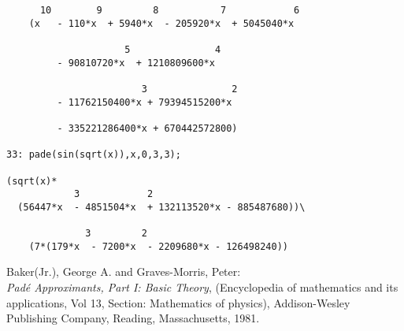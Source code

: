 \begin{verbatim}
      10        9         8           7            6
    (x   - 110*x  + 5940*x  - 205920*x  + 5045040*x

                     5               4
         - 90810720*x  + 1210809600*x 

                        3               2
         - 11762150400*x + 79394515200*x  

         - 335221286400*x + 670442572800)

33: pade(sin(sqrt(x)),x,0,3,3);
        
(sqrt(x)*
            3            2
  (56447*x  - 4851504*x  + 132113520*x - 885487680))\

              3         2
    (7*(179*x  - 7200*x  - 2209680*x - 126498240))
\end{verbatim}


\begin{thebibliography}{9}
 Baker(Jr.), George A. and Graves-Morris, Peter:\\
{\it Pad\'{e} Approximants, Part I: Basic Theory},
(Encyclopedia of mathematics and its applications, Vol 13,
Section: Mathematics of physics),
Addison-Wesley Publishing Company, Reading, Massachusetts, 1981.
\end{thebibliography}
